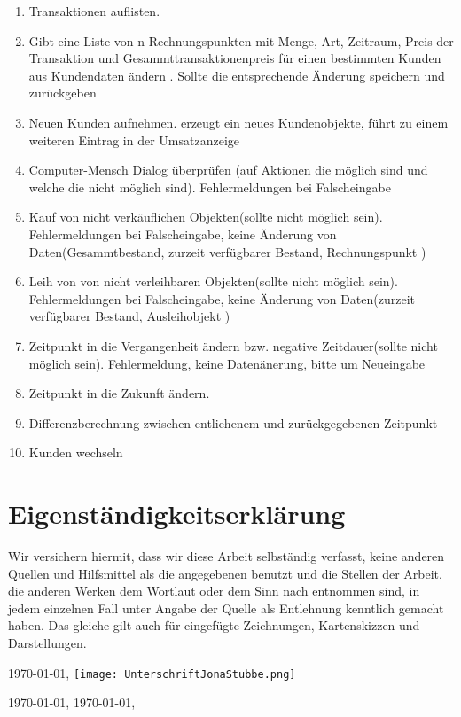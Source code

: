 \documentclass[a4paper,12pt,titlepage]{article}
\begin{document}
\begin{enumerate}
\item
Transaktionen auflisten.
\item
\Rightarrow Gibt eine Liste von n Rechnungspunkten mit Menge, Art, Zeitraum, Preis der Transaktion und Gesammttransaktionenpreis für einen bestimmten Kunden aus
Kundendaten ändern .
\Rightarrow Sollte die entsprechende Änderung speichern und zurückgeben
\item
Neuen Kunden aufnehmen.
\Rightarrow erzeugt ein neues Kundenobjekte, führt zu einem weiteren Eintrag in der Umsatzanzeige
\item
Computer-Mensch Dialog überprüfen (auf Aktionen die möglich sind und welche die nicht möglich sind).
\Rightarrow Fehlermeldungen bei Falscheingabe
\item
Kauf von nicht verkäuflichen Objekten(sollte nicht möglich sein).
\Rightarrow Fehlermeldungen bei Falscheingabe, keine Änderung von Daten(Gesammtbestand, zurzeit verfügbarer Bestand, Rechnungspunkt )
\item
Leih von von nicht verleihbaren Objekten(sollte nicht möglich sein).
\Rightarrow Fehlermeldungen bei Falscheingabe, keine Änderung von Daten(zurzeit verfügbarer Bestand, Ausleihobjekt )
\item
Zeitpunkt in die Vergangenheit ändern bzw. negative Zeitdauer(sollte nicht möglich sein).
\Rightarrow Fehlermeldung, keine Datenänerung, bitte um Neueingabe
\item
Zeitpunkt in die Zukunft ändern.
\item
Differenzberechnung zwischen entliehenem und zurückgegebenen Zeitpunkt
\item
Kunden wechseln


\end{enumerate}
\appendix
\newpage
\part{Eigenständigkeitserklärung}
Wir versichern hiermit, dass wir diese Arbeit selbständig verfasst, keine anderen Quellen und Hilfsmittel
als die angegebenen benutzt und die Stellen der Arbeit, die anderen Werken dem Wortlaut oder dem Sinn nach entnommen sind,
in jedem einzelnen Fall unter Angabe der Quelle als Entlehnung kenntlich gemacht haben.
Das gleiche gilt auch für eingefügte Zeichnungen, Kartenskizzen und Darstellungen.

\today, \texttt{[image: UnterschriftJonaStubbe.png]}

\today, 
\today,
\end{document}
